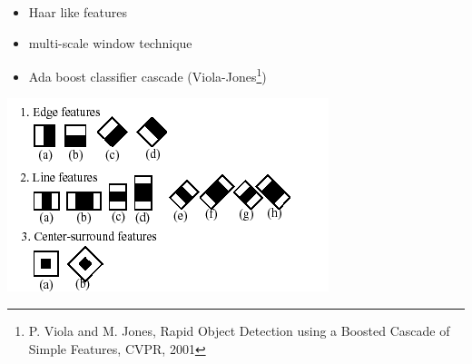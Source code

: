 \begin{xpsectionbox}{}{}


\begin{minipage}{0.5\linewidth}

{\vspace*{0.2cm}\noindent\hspace*{0.2cm}{\bf\Titlesize Method}\newline}{\vspace{-0.75cm}}

\begin{itemize}
	  \item Haar like features  
	  \item multi-scale window technique
	  \item Ada boost classifier cascade (Viola-Jones\footnote{P. Viola and M. Jones, Rapid Object Detection using a Boosted Cascade of Simple Features, CVPR, 2001})
\end{itemize}
\begin{center}
			\includegraphics[height=0.25\linewidth]{images/Haar_features}
\end{center}

{\vspace*{0.2cm}\noindent\hspace*{0.2cm}{\bf\Titlesize Drawbacks}\newline}{\vspace{-0.75cm}}


\end{minipage}
\end{xpsectionbox}
